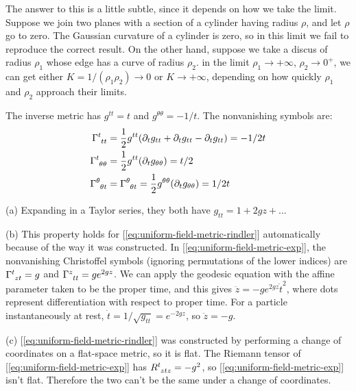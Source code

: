 

The answer to this is a little subtle, since it depends on how we take the limit.
Suppose we join two planes with a section of a cylinder having radius $\rho$, and let $\rho$ go to zero.
The Gaussian curvature of a cylinder is zero, so in this limit we fail to reproduce the correct result.
On the other hand, suppose we take a discus of radius $\rho_1$ whose edge has a curve of radius $\rho_2$.
in the limit $\rho_1\rightarrow+\infty$, $\rho_2\rightarrow0^+$, we can get either $K=1/(\rho_1\rho_2)\rightarrow 0$ or
$K\rightarrow+\infty$, depending on how quickly $\rho_1$ and $\rho_2$ approach their limits.


The inverse metric has $g^{tt}=t$ and $g^{\theta\theta}=-1/t$.
The nonvanishing symbols are:
\begin{align*}
  \Gamma\indices{^t_{tt}} &= \frac{1}{2}g^{tt}(\partial_t g_{tt}+\partial_t g_{tt}-\partial_t g_{tt}) = -1/2t\\
  \Gamma\indices{^t_{\theta\theta}} &= \frac{1}{2}g^{tt}(\partial_t g_{\theta\theta}) = t/2  \\
  \Gamma\indices{^\theta_{\theta t}} &= \Gamma\indices{^\theta_{\theta t}} = \frac{1}{2}g^{\theta\theta}(\partial_t g_{\theta\theta}) = 1/2t  \\
\end{align*}


(a) Expanding in a Taylor series, they both have $g_{tt}=1+2gz+\ldots$

(b) This property holds for [\ref{eq:uniform-field-metric-rindler}] automatically because of the way it was constructed.
In [\ref{eq:uniform-field-metric-exp}], the nonvanishing Christoffel
symbols (ignoring permutations of the lower indices) are $\Gamma\indices{^t_{zt}}=g$ and $\Gamma\indices{^z_{tt}}=ge^{2gz}$.
We can apply the geodesic equation with the affine parameter taken to be the proper time, and this gives 
$\ddot{z}=-ge^{2gz}\dot{t}^2$, where dots represent differentiation with respect to proper time.
For a particle instantaneously at rest, $\dot{t}=1/\sqrt{g_{tt}}=e^{-2gz}$, so $\ddot{z}=-g$.

(c) [\ref{eq:uniform-field-metric-rindler}] was constructed by performing a change of coordinates on a flat-space metric, so it is flat. 
The Riemann tensor of [\ref{eq:uniform-field-metric-exp}] has $R\indices{^t_{ztz}}=-g^2$, so [\ref{eq:uniform-field-metric-exp}] isn't flat.
Therefore the two can't be the same under a change of coordinates.

